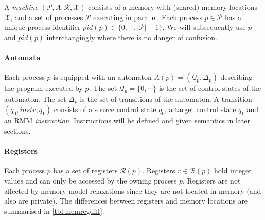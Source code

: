 \documentclass[a4paper]{article}
\begin{document}
\newcommand{\vars}{\mathcal{X}} %
\newcommand{\procs}{\mathcal{P}} %
\newcommand{\automata}{A} %
\newcommand{\pautomaton}[1]{A(#1)} %
\newcommand{\regs}{\mathcal{R}} %
\newcommand{\pregs}[1]{\mathcal{R}(#1)} %
\newcommand{\pcstates}[1]{\mathcal{Q}_{#1}} %
\newcommand{\ptransitions}[1]{\Delta_{#1}} %


A \emph{machine} $(\procs,\automata,\regs,\vars)$ consists of a memory
with (shared) memory locations $\vars$, and a set of processes
$\procs$ executing in parallel. Each process $p\in\procs$ has a unique
process identifier $pid(p) \in \{0,\cdots,|\procs|-1\}$. We will
subsequently use $p$ and $pid(p)$ interchangingly where there is no
danger of confusion. 

\paragraph{Automata}
Each process $p$ is equipped with an automaton $\pautomaton{p} =
(\pcstates{p},\ptransitions{p})$ describing the program executed by
$p$. The set $\pcstates{p} = \{0,\cdots\}$ is the set of control
states of the automaton. The set $\ptransitions{p}$ is the set of
transitions of the automaton. A transition $(q_0,instr,q_1)$ consists
of a source control state $q_0$, a target control state $q_1$ and an
RMM \emph{instruction}. Instructions will be defined and given
semantics in later sections.

\paragraph{Registers} 
Each process $p$ has a set of registers $\pregs{p}$. Registers
$r\in\pregs{p}$ hold integer values and can only be accessed by the
owning process $p$. Registers are not affected by memory model
relaxations since they are not located in memory (and also are
private). The differences between registers and memory locations are
summarised in \cref{tbl:memregdiff}.
\end{document}
